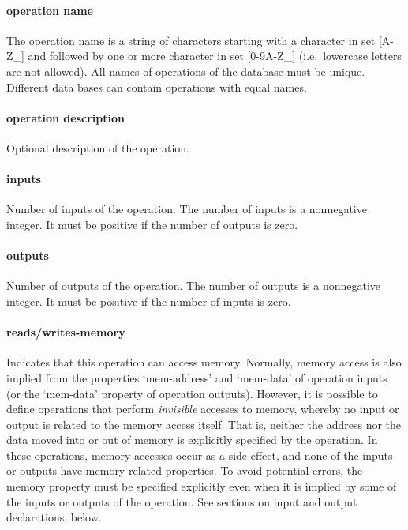\documentclass[twoside]{tceusermanual}
\begin{document}
\paragraph{operation name}
The operation name is a string of characters starting with a character in
set [A-Z\_] and followed by one or more character in set [0-9A-Z\_] 
(i.e.\ lowercase letters are not allowed).  All
names of operations of the database must be unique. Different data bases 
can contain operations with equal names. 

\paragraph{operation description}
Optional description of the operation.

\paragraph{inputs}
Number of inputs of the operation. The number of inputs is a
nonnegative integer. It must be positive if the number of outputs is
zero.

\paragraph{outputs}

Number of outputs of the operation. The number of outputs is a
nonnegative integer. It must be positive if the number of inputs is
zero.

\paragraph{reads/writes-memory}

Indicates that this operation can access memory.  Normally, memory access is
also implied from the properties `mem-address' and `mem-data' of operation
inputs (or the `mem-data' property of operation outputs).  However, it is
possible to define operations that perform \emph{invisible} accesses to
memory, whereby no input or output is related to the memory access itself.
That is, neither the address nor the data moved into or out of memory is
explicitly specified by the operation.  In these operations, memory accesses
occur as a side effect, and none of the inputs or outputs have
memory-related properties.  To avoid potential errors, the memory property
must be specified explicitly even when it is implied by some of the inputs
or outputs of the operation.  See sections on input and output declarations,
below.
\end{document}

